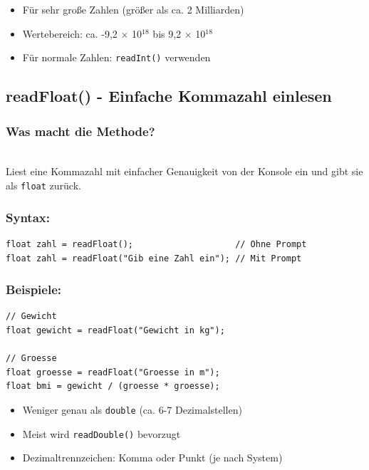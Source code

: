 \begin{achtung}
	\begin{itemize}
		\item Für sehr große Zahlen (größer als ca. 2 Milliarden)
		\item Wertebereich: ca. -9,2 $\times$ 10$^{18}$ bis 9,2 $\times$ 10$^{18}$
		\item Für normale Zahlen: \texttt{readInt()} verwenden
	\end{itemize}
\end{achtung}

\newpage


\subsection*{readFloat() - Einfache Kommazahl einlesen}

\subsubsection*{Was macht die Methode?}\\
Liest eine Kommazahl mit einfacher Genauigkeit von der Konsole ein und gibt sie als \texttt{float} zurück.

\subsubsection*{Syntax:}
\begin{lstlisting}
float zahl = readFloat();                    // Ohne Prompt
float zahl = readFloat("Gib eine Zahl ein"); // Mit Prompt
\end{lstlisting}

\subsubsection*{Beispiele:}
\begin{lstlisting}
// Gewicht
float gewicht = readFloat("Gewicht in kg");

// Groesse
float groesse = readFloat("Groesse in m");
float bmi = gewicht / (groesse * groesse);
\end{lstlisting}

\begin{achtung}
	\begin{itemize}
		\item Weniger genau als \texttt{double} (ca. 6-7 Dezimalstellen)
		\item Meist wird \texttt{readDouble()} bevorzugt
		\item Dezimaltrennzeichen: Komma oder Punkt (je nach System)
	\end{itemize}
\end{achtung}

